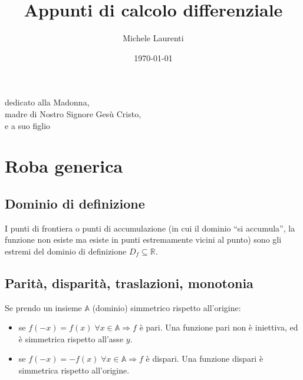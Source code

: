 \documentclass[12pt,a4paper]{article}
\begin{document}
\title{Appunti di calcolo differenziale}
\author{Michele Laurenti}
\date{\today}

\maketitle

\begin{center}
dedicato alla Madonna, \\
madre di Nostro Signore Ges\`u Cristo, \\
e a suo figlio
\end{center}

\newpage


\tableofcontents
\newpage

\section{Roba generica}

\subsection{Dominio di definizione}
I punti di frontiera o punti di accumulazione (in cui il dominio ``si 
accumula'', la funzione non esiste ma esiste in punti estremamente 
vicini al punto) sono gli estremi del dominio di definizione $D_f 
\subseteq \mathbb{R}$.

\subsection{Parit\`a, disparit\`a, traslazioni, monotonia}
Se prendo un insieme $\mathbb{A}$ (dominio) simmetrico rispetto all'origine:
\begin{itemize}
\item   se $ f(-x) = f(x) \; \forall x \in \mathbb{A} \Rightarrow f $ \`e pari.
        Una funzione pari non \`e iniettiva, ed \`e simmetrica rispetto 
        all'asse $y$.
\item   se $ f(-x) = -f(x) \; \forall x \in \mathbb{A} \Rightarrow f $ \`e
        dispari. Una funzione dispari \`e simmetrica rispetto all'origine.
\end{itemize}
\end{document}
